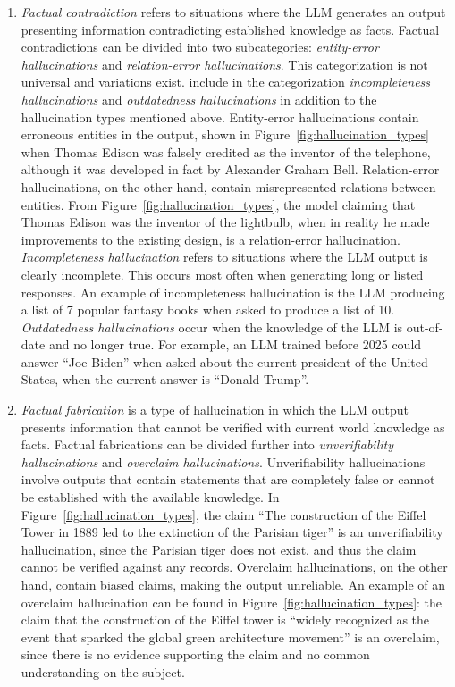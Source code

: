\documentclass[english, 12pt, a4paper, sci, utf8, a-2b, online]{latex/definitions/aaltothesis}
\begin{document}
\begin{enumerate}
    \item \textit{Factual contradiction} refers to situations where the LLM generates an output presenting information contradicting established knowledge as facts. Factual contradictions can be divided into two subcategories: \textit{entity-error hallucinations} and \textit{relation-error hallucinations}. This categorization is not universal and variations exist. \textcite{li2024dawndarkempiricalstudy} include in the categorization \textit{incompleteness hallucinations} and \textit{outdatedness hallucinations} in addition to the hallucination types mentioned above. Entity-error hallucinations contain erroneous entities in the output, shown in Figure~\ref{fig:hallucination_types} when Thomas Edison was falsely credited as the inventor of the telephone, although it was developed in fact by Alexander Graham Bell. Relation-error hallucinations, on the other hand, contain misrepresented relations between entities. From Figure~\ref{fig:hallucination_types}, the model claiming that Thomas Edison was the inventor of the lightbulb, when in reality he made improvements to the existing design, is a relation-error hallucination. \textit{Incompleteness hallucination} refers to situations where the LLM output is clearly incomplete. This occurs most often when generating long or listed responses. An example of incompleteness hallucination is the LLM producing a list of 7 popular fantasy books when asked to produce a list of 10. \textit{Outdatedness hallucinations} occur when the knowledge of the LLM is out-of-date and no longer true. For example, an LLM trained before 2025 could answer ``Joe Biden'' when asked about the current president of the United States, when the current answer is ``Donald Trump''.
    
    \item \textit{Factual fabrication} is a type of hallucination in which the LLM output presents information that cannot be verified with current world knowledge as facts. Factual fabrications can be divided further into \textit{unverifiability hallucinations} and \textit{overclaim hallucinations}. Unverifiability hallucinations involve outputs that contain statements that are completely false or cannot be established with the available knowledge. In Figure~\ref{fig:hallucination_types}, the claim ``The construction of the Eiffel Tower in 1889 led to the extinction of the Parisian tiger'' is an unverifiability hallucination, since the Parisian tiger does not exist, and thus the claim cannot be verified against any records. Overclaim hallucinations, on the other hand, contain biased claims, making the output unreliable. An example of an overclaim hallucination can be found in Figure~\ref{fig:hallucination_types}: the claim that the construction of the Eiffel tower is ``widely recognized as the event that sparked the global green architecture movement'' is an overclaim, since there is no evidence supporting the claim and no common understanding on the subject.

\end{enumerate}
\end{document}

